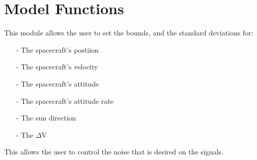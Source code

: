 \section{Model Functions}

This module allows the user to set the bounds, and the standard deviations for:

\begin{itemize}
\item[-] The spacecraft's postiion
\item[-] The spacecraft's velocity
\item[-] The spacecraft's attitude
\item[-] The spacecraft's attitude rate
\item[-] The sun direction
\item[-] The $\Delta $V
\end{itemize}

This allows the user to control the noise that is desired on the signals. 